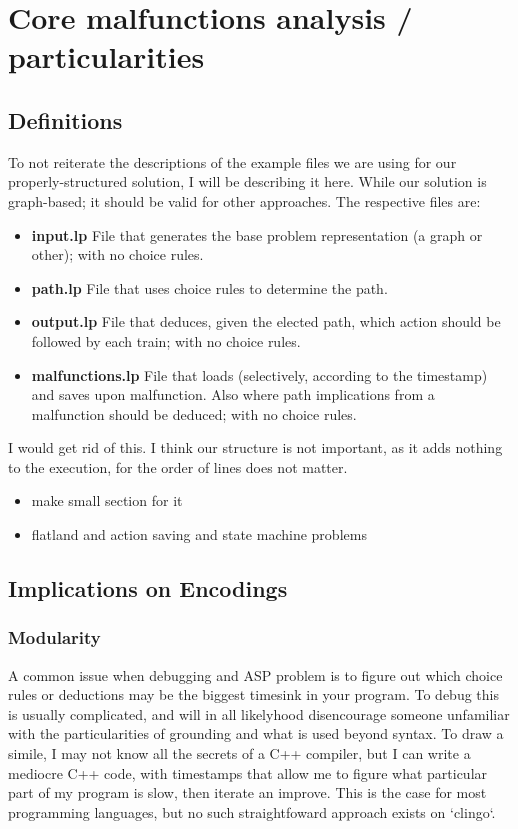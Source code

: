 \documentclass{llncs}
\begin{document}
\section{Core malfunctions analysis / particularities}

\color{green}
\subsection{Definitions}
To not reiterate the descriptions of the example files we are using for our properly-structured solution, I will be describing it here. While our solution is graph-based; it should be valid for other approaches. The respective files are:
\begin{itemize}
	\item  \textbf{input.lp} File that generates the base problem representation (a graph or other); with no choice rules.
	\item  \textbf{path.lp} File that uses choice rules to determine the path.
	\item  \textbf{output.lp} File that deduces, given the elected path, which action should be followed by each train; with no choice rules.
	\item  \textbf{malfunctions.lp} File that loads (selectively, according to the timestamp) and saves upon malfunction. Also where path implications from a malfunction should be deduced; with no choice rules.
\end{itemize}
\color{black} \color{gray} I would get rid of this. I think our structure is not important, as it adds nothing to the execution, for the order of lines does not matter. \color{black}
\color{blue}
\begin{itemize}
	\item make small section for it
	\item flatland and action saving and state machine problems
\end{itemize}
\color{black}


\subsection{Implications on Encodings}
\color{green}
\subsubsection{Modularity}
A common issue when debugging and ASP problem is to figure out which choice rules or deductions may be the biggest timesink in your program. To debug this is usually complicated, and will in all likelyhood disencourage someone unfamiliar with the particularities of grounding and what is used beyond syntax. To draw a simile, I may not know all the secrets of a C++ compiler, but I can write a mediocre C++ code, with timestamps that allow me to figure what particular part of my program is slow, then iterate an improve. This is the case for most programming languages, but no such straightfoward approach exists on `clingo`.
\end{document}
